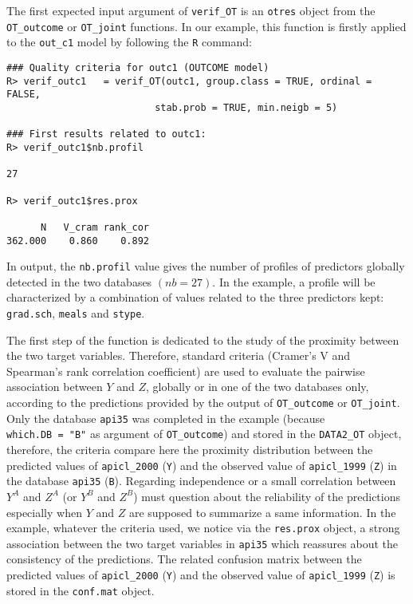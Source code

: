 The first expected input argument of \texttt{verif\_OT} is an \texttt{\textquotesingle{}otres\textquotesingle{}} object from the \texttt{OT\_outcome} or \texttt{OT\_joint} functions. In our example, this function is firstly applied to the \texttt{out\_c1} model by following the \texttt{R} command:

\begin{verbatim}
### Quality criteria for outc1 (OUTCOME model)
R> verif_outc1   = verif_OT(outc1, group.class = TRUE, ordinal = FALSE, 
                          stab.prob = TRUE, min.neigb = 5)

### First results related to outc1:
R> verif_outc1$nb.profil

27

R> verif_outc1$res.prox

      N   V_cram rank_cor
362.000    0.860    0.892
\end{verbatim}

In output, the \texttt{nb.profil} value gives the number of profiles of predictors globally detected in the two databases \((nb = 27)\). In the example, a profile will be characterized by a combination of values related to the three predictors kept: \texttt{grad.sch}, \texttt{meals} and \texttt{stype}.

The first step of the function is dedicated to the study of the proximity between the two target variables. Therefore, standard criteria (Cramer's V and Spearman's rank correlation coefficient) are used to evaluate the pairwise association between \(Y\) and \(Z\), globally or in one of the two databases only, according to the predictions provided by the output of \texttt{OT\_outcome} or \texttt{OT\_joint}. Only the database \texttt{api35} was completed in the example (because \texttt{which.DB\ =\ "B"} as argument of \texttt{OT\_outcome}) and stored in the \texttt{DATA2\_OT} object, therefore, the criteria compare here the proximity distribution between the predicted values of \texttt{apicl\_2000} (\texttt{Y}) and the observed value of \texttt{apicl\_1999} (\texttt{Z}) in the database \texttt{api35} (\texttt{B}). Regarding independence or a small correlation between \(Y^A\) and \(Z^A\) (or \(Y^B\) and \(Z^B\)) must question about the reliability of the predictions especially when \(Y\) and \(Z\) are supposed to summarize a same information. In the example, whatever the criteria used, we notice via the \texttt{res.prox} object, a strong association between the two target variables in \texttt{api35} which reassures about the consistency of the predictions.
The related confusion matrix between the predicted values of \texttt{apicl\_2000} (\texttt{Y}) and the observed value of \texttt{apicl\_1999} (\texttt{Z}) is stored in the \texttt{conf.mat} object.

